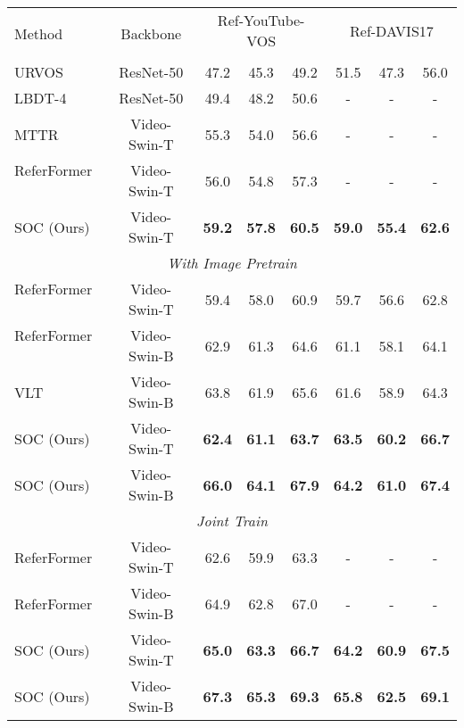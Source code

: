 \documentclass{article}
\begin{document}
\begin{table*}[t]
    \centering
    \footnotesize
    \renewcommand\arraystretch{0.8}
    \setlength{\tabcolsep}{10pt}
\begin{tabular}{l|c|ccc|ccc}
    \toprule
    \multirow{2}{*}{Method} & \multirow{2}{*}{Backbone} & \multicolumn{3}{c}{Ref-YouTube-VOS}  & \multicolumn{3}{c}{Ref-DAVIS17} \\ \cline{3-8} 
                            &                           &  &  & \multicolumn{1}{c|}{} &        &         &   \\ 
    \midrule
    
    URVOS~\cite{urvos} & ResNet-50 & 47.2 & 45.3 & 49.2 & 51.5 & 47.3 & 56.0 \\
    LBDT-4~\cite{lbdt} & ResNet-50 & 49.4 & 48.2 & 50.6 & - & - & - \\
    MTTR   ~\cite{mttr} & Video-Swin-T & 55.3 & 54.0 & 56.6 & - & - & - \\
    ReferFormer ~\cite{referformer} & Video-Swin-T   &56.0 & 54.8 & 57.3 & - & - & - \\   
    \rowcolor{gray!10} SOC (Ours) & Video-Swin-T   &\textbf{59.2} &\textbf{57.8} & \textbf{60.5} & \textbf{59.0} & \textbf{55.4} & \textbf{62.6} \\    
    \midrule
        \multicolumn{8}{c}{\textit{With Image Pretrain}} \\
        \midrule
    ReferFormer ~\cite{referformer} & Video-Swin-T & 59.4 & 58.0 & 60.9 & 59.7 & 56.6 & 62.8 \\
    ReferFormer ~\cite{referformer} & Video-Swin-B & 62.9 & 61.3 & 64.6 & 61.1 & 58.1 & 64.1 \\
    VLT~\cite{vlt} & Video-Swin-B & 63.8 & 61.9 & 65.6 & 61.6 & 58.9 & 64.3 \\
    \rowcolor{gray!10} SOC (Ours) & Video-Swin-T &\textbf{62.4} &\textbf{61.1} & \textbf{63.7} & \textbf{63.5} & \textbf{60.2} & \textbf{66.7} \\
    \rowcolor{gray!10} SOC (Ours) & Video-Swin-B & \textbf{66.0} & \textbf{64.1} & \textbf{67.9} & \textbf{64.2} & \textbf{61.0} & \textbf{67.4} \\
    
    \midrule
        \multicolumn{8}{c}{\textit{Joint Train}} \\
        \midrule
    ReferFormer & Video-Swin-T & 62.6 &59.9 &63.3 & - & - & - \\
    ReferFormer & Video-Swin-B & 64.9 &62.8 &67.0 & - & - & - \\
    \rowcolor{gray!10} SOC (Ours) & Video-Swin-T & \textbf{65.0} & \textbf{63.3} & \textbf{66.7} & \textbf{64.2} & \textbf{60.9} & \textbf{67.5} \\
    \rowcolor{gray!10} SOC (Ours) & Video-Swin-B & \textbf{67.3} & \textbf{65.3} & \textbf{69.3} & \textbf{65.8} & \textbf{62.5} & \textbf{69.1} \\
    \bottomrule
    

\end{tabular}
\end{table*}
\end{document}
